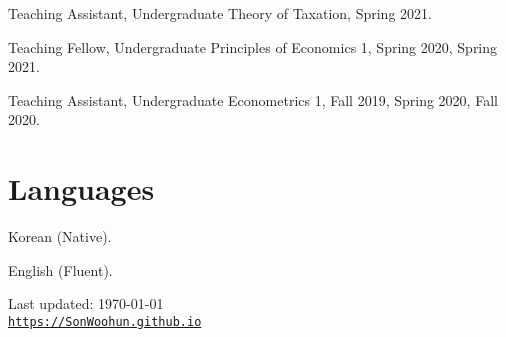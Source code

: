 \documentclass[letterpaper]{article}
\def\footerlink{https://SonWoohun.github.io}
\renewenvironment{itemize}{
  \begin{list}{}{
    \setlength{\leftmargin}{1.5em}
  }
}{
  \end{list}
}
\begin{document}
\begin{itemize}
\item Teaching Assistant, Undergraduate Theory of Taxation, Spring 2021.
\item Teaching Fellow, Undergraduate Principles of Economics 1, Spring 2020, Spring 2021.
\item Teaching Assistant, Undergraduate Econometrics 1, Fall 2019, Spring 2020, Fall 2020.
\end{itemize}


\section*{Languages}

\begin{itemize}
\item Korean (Native).
\item English (Fluent).
\end{itemize}


\bigskip

\begin{center}
  \begin{footnotesize}
    Last updated: \today \\
    \href{\footerlink}{\texttt{\footerlink}}
  \end{footnotesize}
\end{center}
\end{document}
